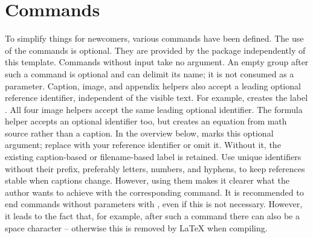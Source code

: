 
\section{Commands}
\label{sec:Commands}

To simplify things for newcomers, various commands have been defined. The use
of the commands is optional. They are provided by the
 package independently of this template.
Commands without input take no argument. An empty group after such a command
is optional and can delimit its name; it is not consumed as a parameter.
Caption, image, and appendix helpers also accept a leading optional reference
identifier, independent of the visible text. For example,
creates the label .
All four image helpers accept the same leading optional identifier.
The formula helper accepts an optional identifier too, but creates an equation
from math source rather than a caption.
In the overview below, \tsTextMonospace{[id]} marks this optional argument;
replace  with your reference identifier or omit it.
Without it, the existing caption-based or filename-based label is retained.
Use unique identifiers without their prefix, preferably letters, numbers, and
hyphens, to keep references stable when captions change.
However, using them makes it clearer what the
author wants to achieve with the corresponding command. It is recommended to
end commands without parameters with \tsTextMonospace{\{\}}, even if this is
not necessary. However, it leads to the fact that, for example, after such a
command there can also be a space character -- otherwise this is removed by
\LaTeX{} when compiling.

